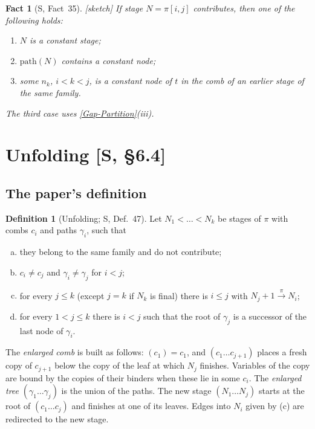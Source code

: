 \documentclass[11pt]{article}
\newcommand{\iv}[2]{\pi[#1,#2]}
\newcommand{\pth}{\mathrm{path}}
\newcommand{\ra}[1]{\xrightarrow{#1}}
\newcommand{\Sketch}{\textsf{[sketch]}}
\theoremstyle{plain}
\newtheorem{fact}[theorem]{Fact}
\theoremstyle{definition}
\newtheorem{definition}[theorem]{Definition}
\theoremstyle{remark}
\newcommand{\GapPartition}{\hyperref[gap:ptree]{[Gap-Partition]}}
\begin{document}
\begin{fact}[S, Fact~35]\label{fact:35}
\Sketch{} If stage $N=\iv ij$ contributes, then one of the following
holds:
\begin{enumerate}
\item $N$ is a constant stage;
\item $\pth(N)$ contains a constant node;
\item some $n_k$, $i<k<j$, is a constant node of $t$ in the comb of an
  earlier stage of the same family.
\end{enumerate}
The third case uses \GapPartition{}(iii).
\end{fact}

\section{Unfolding [S, \S6.4]}\label{sec:unfolding}

\subsection{The paper's definition}

\begin{definition}[Unfolding; S, Def.~47]\label{def:unfold}
Let $N_1<\dots<N_k$ be stages of $\pi$ with combs $c_i$ and paths
$\gamma_i$, such that
\begin{enumerate}[(a)]
\item they belong to the same family and do not contribute;
\item $c_i\ne c_j$ and $\gamma_i\ne\gamma_j$ for $i<j$;
\item for every $j\le k$ (except $j=k$ if $N_k$ is final) there is
  $i\le j$ with $N_j+1\ra\pi N_i$;
\item for every $1<j\le k$ there is $i<j$ such that the root of
  $\gamma_j$ is a successor of the last node of $\gamma_i$.
\end{enumerate}
The \emph{enlarged comb} is built as follows: $(c_1)=c_1$, and
$(c_1\dots c_{j+1})$ places a fresh copy of $c_{j+1}$ below the copy of
the leaf at which $N_j$ finishes.  Variables of the copy are bound by
the copies of their binders when these lie in some $c_i$.  The
\emph{enlarged tree} $(\gamma_1\dots\gamma_j)$ is the union of the paths.
The new stage $(N_1\dots N_j)$ starts at the root of $(c_1\dots c_j)$
and finishes at one of its leaves.  Edges into $N_i$ given by (c) are
redirected to the new stage.
\end{definition}
\end{document}
